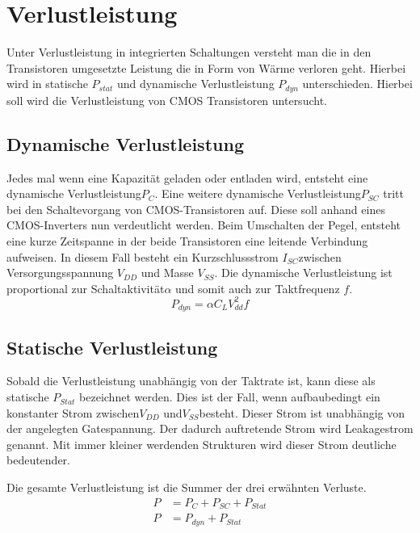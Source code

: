 \section{Verlustleistung}
\label{sec:verlustleistung}
Unter Verlustleistung in integrierten Schaltungen versteht man die in den Transistoren umgesetzte Leistung die in Form von Wärme verloren geht.
Hierbei wird in statische \(P_{stat}\) und dynamische Verlustleistung \(P_{dyn}\) unterschieden. \cite[Seite 4 ff.]{flynn2007low} Hierbei soll wird die Verlustleistung von CMOS Transistoren untersucht.
\subsection{Dynamische Verlustleistung}\label{subsec:dynVerl}
Jedes mal wenn eine Kapazität geladen oder entladen wird, entsteht eine dynamische Verlustleistung\(P_C\). Eine weitere dynamische Verlustleistung\(P_{SC}\) tritt bei den Schaltevorgang von CMOS-Transistoren auf. Diese soll anhand eines CMOS-Inverters nun verdeutlicht werden. Beim Umschalten der Pegel, entsteht eine kurze Zeitspanne in der beide Transistoren eine leitende Verbindung aufweisen. In diesem Fall besteht ein Kurzschlussstrom \(I_{SC}\)zwischen Versorgungsspannung \(V_{DD}\) und Masse \(V_{SS}\). Die dynamische Verlustleistung ist proportional zur Schaltaktivität\(\alpha\) und somit auch zur Taktfrequenz $f$.\cite[Seite 4 ff.]{flynn2007low}
\begin{equation}
P_{dyn} = \alpha  C_L  V_{dd}^{2}  f
\label{eq:dynVerlustleistung}
\end{equation}
\subsection{Statische Verlustleistung}\label{subsec:statVerl}
Sobald die Verlustleistung unabhängig von der Taktrate ist, kann diese als statische \(P_{Stat}\) bezeichnet werden. Dies ist der Fall, wenn aufbaubedingt ein konstanter Strom zwischen\(V_{DD}\) und\(V_{SS}\)besteht. Dieser Strom ist unabhängig von der angelegten Gatespannung. Der dadurch auftretende Strom wird Leakagestrom genannt. Mit immer kleiner werdenden Strukturen wird dieser Strom deutliche bedeutender.\cite[Seite 8]{flynn2007low}

Die gesamte Verlustleistung ist die Summer der drei erwähnten Verluste.
\begin{equation}
\begin{aligned}
P &= P_{ C }+P_{ SC }+P_{ Stat}\\
P &= P_{dyn}+P_{Stat}
\label{eq:verlustleistung}
\end{aligned}
\end{equation}

